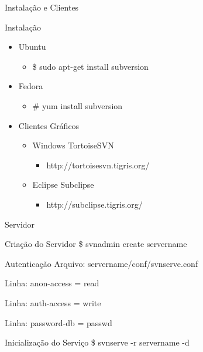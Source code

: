 \documentclass[hyperref={pdfpagelabels=false}]{beamer}
\begin{document}
\begin{frame}{Instalação e Clientes}
    \begin{block}{Instalação}
        \begin{itemize}
            \item Ubuntu
            \begin{itemize}
                \item \$ sudo apt-get install subversion
            \end{itemize}
            \item Fedora
            \begin{itemize}
                \item \# yum install subversion
            \end{itemize}
            \item Clientes Gráficos
            \begin{itemize}
                \item Windows TortoiseSVN
                \begin{itemize}
                    \item http://tortoisesvn.tigris.org/
                \end{itemize}
                \item Eclipse Subclipse
                \begin{itemize}
                    \item http://subclipse.tigris.org/
                \end{itemize}
            \end{itemize}
        \end{itemize}
    \end{block}
\end{frame}

\begin{frame}{Servidor}
    \begin{block}{Criação do Servidor}
        \$ svnadmin create servername
    \end{block}
    \pause{}
    \begin{block}{Autenticação}
        Arquivo: servername/conf/svnserve.conf

        Linha: anon-access = read

        Linha: auth-access = write

        Linha: password-db = passwd
    \end{block}
    \pause{}
    \begin{block}{Inicialização do Serviço}
        \$ svnserve -r servername -d
    \end{block}
    \pause{}
\end{frame}
\end{document}
